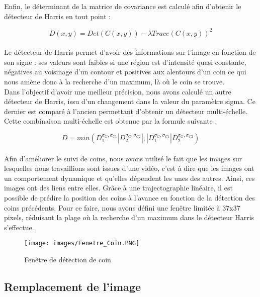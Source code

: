 \documentclass[blue]{ceri/sty/rapport}
\begin{document}
Enfin, le déterminant de la matrice de covariance est calculé afin d'obtenir le détecteur de Harris en tout point : 

\begin{equation}
   D(x,y)= Det(C(x,y)) - \lambda Trace(C(x,y))^2
\end{equation}
 \\
 Le détecteur de Harris permet d'avoir des informations sur l'image en fonction de son signe : ses valeurs sont faibles si une région est d'intensité quasi constante, négatives au voisinage d'un contour et positives aux alentours d'un coin ce qui nous amène donc à la recherche d'un maximum, là où le coin se trouve.
\\
 
Dans l'objectif d'avoir une meilleur précision, nous avons calculé un autre détecteur de Harris, issu d'un changement dans la valeur du paramètre sigma. Ce dernier est comparé à l'ancien permettant d'obtenir un détecteur multi-échelle.
Cette combinaison multi-échelle est obtenue par la formule suivante : 

 \begin{equation}
   D = min(D_1^{\sigma_{G},\sigma_{C1}}|D_2^{\sigma_{G},\sigma_{C2}}|,|D_1^{\sigma_{G},\sigma_{C1}}|D_2^{\sigma_{G},\sigma_{C2}})
\end{equation}
\\
Afin d'améliorer le suivi de coins, nous avons utilisé le fait que les images sur lesquelles nous travaillions sont issues d'une vidéo, c'est à dire que les images ont un comportement dynamique et qu'elles dépendent les unes des autres. Ainsi, ces images ont des liens entre elles. Grâce à une trajectographie linéaire, il est possible de prédire la position des coins à l'avance en fonction de la détection des coins précédents. Pour ce faire, nous avons défini une fenêtre limitée à 37x37 pixels, réduisant la plage où la recherche d'un maximum dans le détecteur Harris s'effectue. 

\begin{figure}[H]
\centering
\texttt{[image: images/Fenetre\_Coin.PNG]}
\caption{Fenêtre de détection de coin}
\end{figure}

 

\subsection{Remplacement de l'image}
\label{sec:OptionsClasse2}
\end{document}
